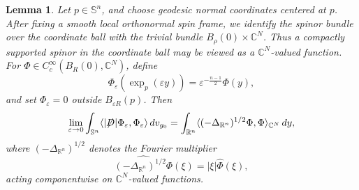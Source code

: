\documentclass[10pt,a4paper]{amsart}
\newtheorem{lemma}{Lemma}
\def\slashiii#1{\setbox0=\hbox{$#1$}#1\hskip-\wd0\hbox to\wd0{\hss\sl/\/\hss}}
\begin{document}
\begin{lemma}
	Let \(p\in\mathbb S^n\), and choose geodesic normal coordinates centered at
	\(p\). After fixing a smooth local orthonormal spin frame, we identify the
	spinor bundle over the coordinate ball with the trivial bundle
	\(B_\rho(0)\times\mathbb C^N\). Thus a compactly supported spinor in the
	coordinate ball may be viewed as a \(\mathbb C^N\)-valued function. For \(\Phi\in C_c^\infty(B_R(0),\mathbb C^N)\), define
	\[
	\Phi_\varepsilon(\exp_p(\varepsilon y))
	=
	\varepsilon^{-\frac{n-1}{2}}\Phi(y),
	\]
	and set \(\Phi_\varepsilon=0\) outside \(B_{\varepsilon R}(p)\). Then
	\begin{equation}\label{numerator}
	\lim_{\varepsilon\to0}
	\int_{\mathbb S^n}
	\langle |\slashiii{D}|\Phi_\varepsilon,\Phi_\varepsilon\rangle\,dv_{g_0}
	=
	\int_{\mathbb R^n}
	\langle (-\Delta_{\mathbb R^n})^{1/2}\Phi,\Phi\rangle_{\mathbb C^N}\,dy,
	\end{equation}
	where \((-\Delta_{\mathbb R^n})^{1/2}\) denotes the Fourier multiplier
	\[
	\widehat{(-\Delta_{\mathbb R^n})^{1/2}\Phi}(\xi)	=|\xi|\widehat{\Phi}(\xi),
	\]
	acting componentwise on \(\mathbb C^N\)-valued functions.
\end{lemma}
\end{document}
